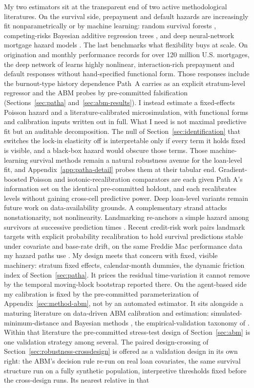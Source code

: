 \documentclass[12pt]{article}
\begin{document}
My two estimators sit at the transparent end of two active methodological literatures. On the survival side, prepayment and default hazards are increasingly fit nonparametrically or by machine learning: random survival forests \citep{ishwaran2008}, competing-risks Bayesian additive regression trees \citep{sparapani2020}, and deep neural-network mortgage hazard models \citep{sadhwani2021}. The last benchmarks what flexibility buys at scale. On origination and monthly performance records for over 120 million U.S. mortgages, the deep network of \citet{sadhwani2021} learns highly nonlinear, interaction-rich prepayment and default responses without hand-specified functional form. Those responses include the burnout-type history dependence Path~A carries as an explicit stratum-level regressor and the ABM probes by pre-committed falsification (Sections~\ref{sec:patha} and~\ref{sec:abm-results}). I instead estimate a fixed-effects Poisson hazard and a literature-calibrated microsimulation, with functional forms and calibration inputs written out in full. What I need is not maximal predictive fit but an auditable decomposition. The null of Section~\ref{sec:identification} that switches the lock-in elasticity off is interpretable only if every term it holds fixed is visible, and a black-box hazard would obscure those terms. Those machine-learning survival methods remain a natural robustness avenue for the loan-level fit, and Appendix~\ref{app:patha-detail} probes them at their tabular end. Gradient-boosted Poisson and isotonic-recalibration comparators are each given Path A's information set on the identical pre-committed holdout, and each recalibrates levels without gaining cross-cell predictive power. Deep loan-level variants remain future work on data-availability grounds. A complementary strand attacks nonstationarity, not nonlinearity. Landmarking re-anchors a simple hazard among survivors at successive prediction times \citep{vanhouwelingen2007,putter2022}. Recent credit-risk work pairs landmark targets with explicit probability recalibration to hold survival predictions stable under covariate and base-rate drift, on the same Freddie Mac performance data my hazard paths use \citep{peng2026}. My design meets that concern with fixed, visible machinery: stratum fixed effects, calendar-month dummies, the dynamic friction index of Section~\ref{sec:patha}. It prices the residual time-variation it cannot remove by the temporal moving-block bootstrap reported there. On the agent-based side my calibration is fixed by the pre-committed parameterization of Appendix~\ref{sec:method-abm}, not by an automated estimator. It sits alongside a maturing literature on data-driven ABM calibration and estimation: simulated-minimum-distance and Bayesian methods \citep{grazzini2017,platt2020}, the empirical-validation taxonomy of \citet{fagiolo2007}. Within that literature the pre-committed stress-test design of Section~\ref{sec:abm} is one validation strategy among several. The paired design-crossing of Section~\ref{sec:robustness-crossdesign} is offered as a validation design in its own right: the ABM's decision rule re-run on real loan covariates, the same survival structure run on a fully synthetic population, interpretive thresholds fixed before the cross-design runs. Its nearest relative in that 
\end{document}
